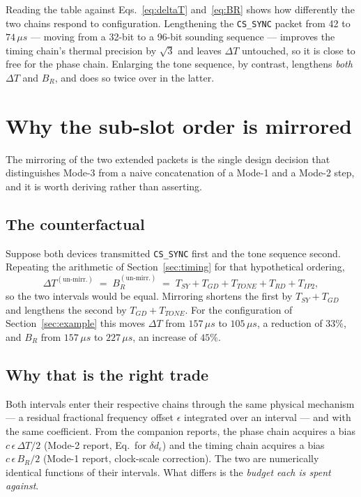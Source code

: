 \documentclass[11pt,a4paper]{article}
\newcommand{\us}{\,\ensuremath{\upmu}s}
\newcommand{\Tsy}{T_{SY}}
\newcommand{\Tgd}{T_{GD}}
\newcommand{\Ttone}{T_{TONE}}
\newcommand{\Trd}{T_{RD}}
\newcommand{\Tipthree}{T_{IP2}}
\newcommand{\code}[1]{\texttt{\small #1}}
\providecommand{\upmu}{\mu}
\begin{document}
Reading the table against Eqs.~\eqref{eq:deltaT} and~\eqref{eq:BR} shows how differently the two
chains respond to configuration. Lengthening the \code{CS\_SYNC} packet from 42 to $74\us$ --- moving
from a 32-bit to a 96-bit sounding sequence --- improves the timing chain's thermal precision by
$\sqrt{3}$ and leaves $\Delta T$ untouched, so it is close to free for the phase chain. Enlarging the
tone sequence, by contrast, lengthens \emph{both} $\Delta T$ and $B_R$, and does so twice over in the
latter.
\section{Why the sub-slot order is mirrored}
\label{sec:mirror}

The mirroring of the two extended packets is the single design decision that distinguishes Mode-3
from a naive concatenation of a Mode-1 and a Mode-2 step, and it is worth deriving rather than
asserting.

\subsection{The counterfactual}

Suppose both devices transmitted \code{CS\_SYNC} first and the tone sequence second. Repeating the
arithmetic of Section~\ref{sec:timing} for that hypothetical ordering,
\begin{equation}
\Delta T^{(\text{un-mirr.})} \;=\; B_R^{(\text{un-mirr.})}
   \;=\; \Tsy + \Tgd + \Ttone + \Trd + \Tipthree ,
\label{eq:unmirrored}
\end{equation}
so the two intervals would be equal. Mirroring shortens the first by $\Tsy+\Tgd$ and lengthens the
second by $\Tgd+\Ttone$. For the configuration of Section~\ref{sec:example} this moves
$\Delta T$ from $157\us$ to $105\us$, a reduction of $33\%$, and $B_R$ from $157\us$ to $227\us$, an
increase of $45\%$.

\subsection{Why that is the right trade}

Both intervals enter their respective chains through the same physical mechanism --- a residual
fractional frequency offset $\epsilon$ integrated over an interval --- and with the same
coefficient. From the companion reports, the phase chain acquires a bias
$c\,\epsilon\,\Delta T/2$ (Mode-2 report, Eq.\ for $\delta d_\epsilon$) and the timing chain acquires
a bias $c\,\epsilon\,B_R/2$ (Mode-1 report, clock-scale correction). The two are numerically
identical functions of their intervals. What differs is the \emph{budget each is spent against}.
\end{document}
